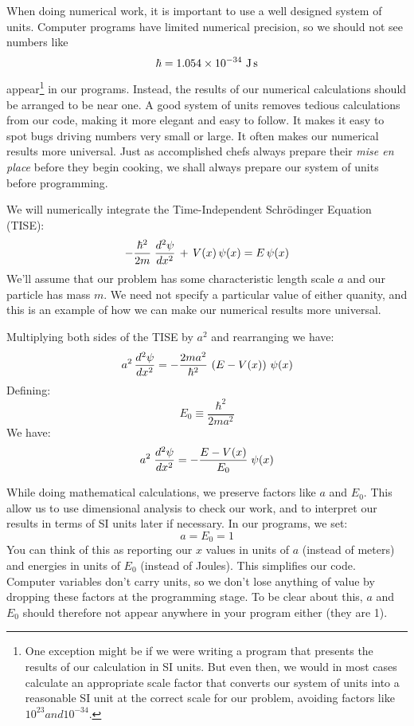 \documentclass[12pt]{article}
\begin{document}
When doing numerical work, it is important to use a well designed
system of units.  Computer programs have limited numerical precision,
so we should not see numbers like
$$\hbar = 1.054 \times 10^{-34} ~ \rm J\,s$$ appear\footnote{One
exception might be if we were writing a program that presents the
results of our calculation in SI units.  But even then, we would in
most cases calculate an appropriate scale factor that converts our
system of units into a reasonable SI unit at the correct scale for our
problem, avoiding factors like $10^{23} and 10^{-34}$.} in our
programs.  Instead, the results of our numerical calculations should
be arranged to be near one.  A good system of units removes tedious
calculations from our code, making it more elegant and easy to follow.
It makes it easy to spot bugs driving numbers very small or large.  It
often makes our numerical results more universal.  Just as
accomplished chefs always prepare their {\em mise en place} before
they begin cooking, we shall always prepare our system of units before
programming.

We will numerically integrate the Time-Independent Schr\"odinger Equation (TISE):
\begin{equation}
- \frac{\hbar^2}{2 m} \;  \frac{d^2 \psi}{dx^2}  \, + \, V(x) \, \psi(x) = E \, \psi(x)\\
\end{equation}
We'll assume that our problem has some characteristic length scale $a$
and our particle has mass $m$.  We need not specify a particular value
of either quanity, and this is an example of how we can make our
numerical results more universal.

Multiplying both sides of the TISE by $a^2$ and rearranging we have:
\begin{equation}
a^2 \,  \frac{d^2 \psi}{dx^2}  = - \frac{2ma^2}{\hbar^2}\,\left(E - V(x)\right) \, \psi(x)\\
\end{equation}
Defining:
\begin{equation}
E_0 \equiv \frac{\hbar^2}{2ma^2}
\end{equation}
We have:
\begin{equation}
a^2 \;  \frac{d^2 \psi}{dx^2}  = - \frac{E - V(x)}{E_0} \; \psi(x)\\
\end{equation}

While doing mathematical calculations, we preserve factors like $a$
and $E_0$.  This allow us to use dimensional analysis to check our
work, and to interpret our results in terms of SI units later if
necessary. In our programs, we set:
$$a = E_0 = 1$$ You can think of this as reporting our $x$ values in
units of $a$ (instead of meters) and energies in units of $E_0$
(instead of Joules).  This simplifies our code.  Computer variables
don't carry units, so we don't lose anything of value by dropping
these factors at the programming stage.  To be clear about this, $a$
and $E_0$ should therefore not appear anywhere in your program either
(they are 1).
\end{document}
